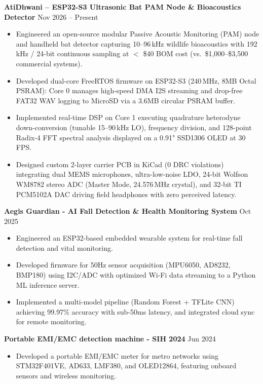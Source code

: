 \documentclass[10pt,a4paper]{article}%
\begin{document}
\noindent \textbf{AtiDhwani -- ESP32-S3 Ultrasonic Bat PAM Node \& Bioacoustics Detector} \hfill Nov 2026 -- Present%
\begin{itemize}[leftmargin=15pt, nosep, topsep=0pt]%
\item Engineered an open-source modular Passive Acoustic Monitoring (PAM) node and handheld bat detector capturing 10--96\,kHz wildlife bioacoustics with 192\,kHz / 24-bit continuous sampling at $<$ \$40 BOM cost (vs.\ \$1,000--\$3,500 commercial systems).%
\item Developed dual-core FreeRTOS firmware on ESP32-S3 (240\,MHz, 8MB Octal PSRAM): Core 0 manages high-speed DMA I2S streaming and drop-free FAT32 WAV logging to MicroSD via a 3.6MB circular PSRAM buffer.%
\item Implemented real-time DSP on Core 1 executing quadrature heterodyne down-conversion (tunable 15--90\,kHz LO), frequency division, and 128-point Radix-4 FFT spectral analysis displayed on a 0.91" SSD1306 OLED at 30\,FPS.%
\item Designed custom 2-layer carrier PCB in KiCad (0 DRC violations) integrating dual MEMS microphones, ultra-low-noise LDO, 24-bit Wolfson WM8782 stereo ADC (Master Mode, 24.576\,MHz crystal), and 32-bit TI PCM5102A DAC driving field headphones with zero perceived latency.%
\end{itemize} \vspace{8pt}

\noindent \textbf{Aegis Guardian - AI Fall Detection \& Health Monitoring System} \hfill Oct 2025%
\begin{itemize}[leftmargin=15pt, nosep, topsep=0pt]%
\item Engineered an ESP32-based embedded wearable system for real-time fall detection and vital monitoring.%
\item Developed firmware for 50Hz sensor acquisition (MPU6050, AD8232, BMP180) using I2C/ADC with optimized Wi-Fi data streaming to a Python ML inference server.%
\item Implemented a multi-model pipeline (Random Forest + TFLite CNN) achieving 99.97\% accuracy with sub-50ms latency, and integrated cloud sync for remote monitoring.%
\end{itemize} \vspace{8pt}

\noindent \textbf{Portable EMI/EMC detection machine - SIH 2024} \hfill Jun 2024%
\begin{itemize}[leftmargin=15pt, nosep, topsep=0pt]%
\item Developed a portable EMI/EMC meter for metro networks using STM32F401VE, AD633, LMF380, and OLED12864, featuring onboard sensors and wireless monitoring.%
\end{itemize} \vspace{8pt}
\end{document}
